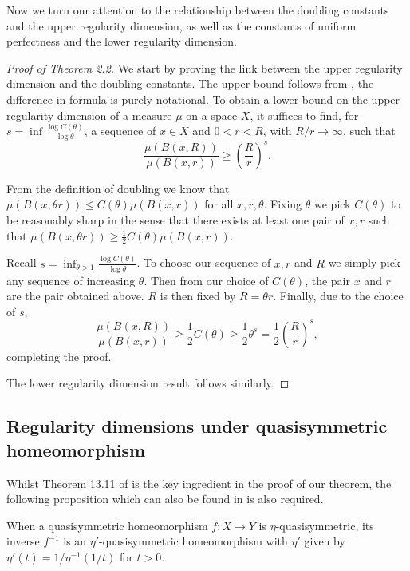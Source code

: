 Now we turn our attention to the relationship between the doubling constants and the upper regularity dimension, as well as the constants of uniform perfectness and the lower regularity dimension.

\begin{proof}[Proof of Theorem 2.2]
	We start by proving the link between the upper regularity dimension and the doubling constants. The upper bound follows from \cite{fraser-howroyd}, the difference in formula is purely notational. To obtain a lower bound on the upper regularity dimension of a measure $\mu$ on a space $X$, it suffices to find, for $s = \inf\frac{\log C(\theta)}{\log \theta}$, a sequence of $x\in X$ and $0<r<R$, with $R/r \rightarrow \infty$, such that 
	\[
	\frac{\mu(B(x,R))}{\mu(B(x,r))} \ge \left(\frac{R}{r}\right)^s.
	\]
	
	
	From the definition of doubling we know that $\mu(B(x,\theta r) ) \le C(\theta) \mu(B(x,r))$ for all $x,r, \theta$. Fixing $\theta$ we pick $C(\theta)$ to be reasonably sharp in the sense that there exists at least one pair of $x,r$ such that $\mu(B(x,\theta r) ) \ge \frac{1}{2}C(\theta) \mu(B(x,r))$. 
	
	Recall $s = \inf_{\theta > 1}\frac{\log C(\theta)}{\log \theta}$. To choose our sequence of $x,r$ and $R$ we simply pick any sequence of increasing $\theta$. Then from our choice of $C(\theta)$, the pair $x$ and $r$ are the pair obtained above. $R$ is then fixed by $R = \theta r$. Finally, due to the choice of $s$,
	\[
	\frac{\mu(B(x,R))}{\mu(B(x,r))} \ge \frac{1}{2} C(\theta)  \ge \frac{1}{2}\theta^s = \frac{1}{2}\left(\frac{R}{r} \right)^s,
	\]
	completing the proof.
	
	The lower regularity dimension result follows similarly.
\end{proof}









\subsection{Regularity dimensions under quasisymmetric homeomorphism}


Whilst Theorem 13.11 of \cite{heinonen} is the key ingredient in the proof of our theorem, the following proposition which can also be found in \cite{heinonen} is also required.

\begin{prop}
	When a quasisymmetric homeomorphism $f\colon X \rightarrow Y$ is $\eta$-quasisymmetric, its inverse $f^{-1}$ is an $\eta'$-quasisymmetric homeomorphism with $\eta'$ given by  $\eta'(t) = 1/\eta^{-1}(1/t)$ for $t>0$.
\end{prop}

